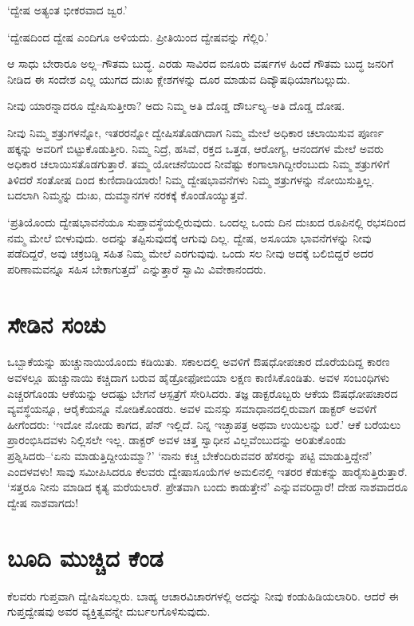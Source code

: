 ‘ದ್ವೇಷ ಅತ್ಯಂತ ಭೀಕರವಾದ ಜ್ವರ.’

‘ದ್ವೇಷದಿಂದ ದ್ವೇಷ ಎಂದಿಗೂ ಅಳಿಯದು. ಪ್ರೀತಿಯಿಂದ ದ್ವೇಷವನ್ನು ಗೆಲ್ಲಿರಿ.’

ಆ ಸಾಧು ಬೇರಾರೂ ಅಲ್ಲ–ಗೌತಮ ಬುದ್ಧ. ಎರಡು ಸಾವಿರದ ಐನೂರು ವರ್ಷಗಳ ಹಿಂದೆ ಗೌತಮ ಬುದ್ಧ ಜನರಿಗೆ ನೀಡಿದ ಈ ಸಂದೇಶ ಎಲ್ಲ ಯುಗದ ದುಃಖ ಕ್ಲೇಶಗಳನ್ನು ದೂರ ಮಾಡುವ ದಿವ್ಯೌಷಧಿಯಾಗಬಲ್ಲುದು.

ನೀವು ಯಾರನ್ನಾದರೂ ದ್ವೇಷಿಸುತ್ತೀರಾ? ಅದು ನಿಮ್ಮ ಅತಿ ದೊಡ್ಡ ದೌರ್ಬಲ್ಯ–ಅತಿ ದೊಡ್ಡ ದೋಷ.

ನೀವು ನಿಮ್ಮ ಶತ್ರುಗಳನ್ನೋ, ಇತರರನ್ನೋ ದ್ವೇಷಿಸತೊಡಗಿದಾಗ ನಿಮ್ಮ ಮೇಲೆ ಅಧಿಕಾರ ಚಲಾಯಿಸುವ ಪೂರ್ಣ ಹಕ್ಕನ್ನು ಅವರಿಗೆ ಬಿಟ್ಟುಕೊಡುತ್ತೀರಿ. ನಿಮ್ಮ ನಿದ್ರೆ, ಹಸಿವೆ, ರಕ್ತದ ಒತ್ತಡ, ಆರೋಗ್ಯ, ಆನಂದಗಳ ಮೇಲೆ ಅವರು ಅಧಿಕಾರ ಚಲಾಯಿಸತೊಡಗುತ್ತಾರೆ. ತಮ್ಮ ಯೋಚನೆಯಿಂದ ನೀವೆಷ್ಟು ಕಂಗಾಲಾಗಿದ್ದೀರೆಂಬುದು ನಿಮ್ಮ ಶತ್ರುಗಳಿಗೆ ತಿಳಿದರೆ ಸಂತೋಷ ದಿಂದ ಕುಣಿದಾಡಿಯಾರು! ನಿಮ್ಮ ದ್ವೇಷಭಾವನೆಗಳು ನಿಮ್ಮ ಶತ್ರುಗಳನ್ನು ನೋಯಿಸುತ್ತಿಲ್ಲ. ಬದಲಾಗಿ ನಿಮ್ಮನ್ನು ದುಃಖ, ದುಮ್ಮಾನಗಳ ನರಕಕ್ಕೆ ಕೊಂಡೊಯ್ಯುತ್ತವೆ.

‘ಪ್ರತಿಯೊಂದು ದ್ವೇಷಭಾವನೆಯೂ ಸುಪ್ತಾವಸ್ಥೆಯಲ್ಲಿರುವುದು. ಒಂದಲ್ಲ ಒಂದು ದಿನ ದುಃಖದ ರೂಪಿನಲ್ಲಿ ರಭಸದಿಂದ ನಮ್ಮ ಮೇಲೆ ಬೀಳುವುದು. ಅದನ್ನು ತಪ್ಪಿಸುವುದಕ್ಕೆ ಆಗುವು ದಿಲ್ಲ. ದ್ವೇಷ, ಅಸೂಯಾ ಭಾವನೆಗಳನ್ನು ನೀವು ಪಡೆದಿದ್ದರೆ, ಅವು ಚಕ್ರಬಡ್ಡಿ ಸಹಿತ ನಿಮ್ಮ ಮೇಲೆ ಎರಗುವುವು. ಒಂದು ಸಲ ನೀವು ಅದಕ್ಕೆ ಬಲಿಬಿದ್ದರೆ ಅದರ ಪರಿಣಾಮವನ್ನೂ ಸಹಿಸ ಬೇಕಾಗುತ್ತದೆ’ ಎನ್ನುತ್ತಾರೆ ಸ್ವಾಮಿ ವಿವೇಕಾನಂದರು.


\section{ಸೇಡಿನ ಸಂಚು}

ಒಬ್ಬಾಕೆಯನ್ನು ಹುಚ್ಚುನಾಯಿಯೊಂದು ಕಡಿಯಿತು. ಸಕಾಲದಲ್ಲಿ ಅವಳಿಗೆ ಔಷಧೋಪಚಾರ ದೊರೆಯದಿದ್ದ ಕಾರಣ ಅವಳಲ್ಲೂ ಹುಚ್ಚುನಾಯಿ ಕಚ್ಚಿದಾಗ ಬರುವ ಹೈಡ್ರೋಫೋಬಿಯಾ ಲಕ್ಷಣ ಕಾಣಿಸಿಕೊಂಡಿತು. ಅವಳ ಸಂಬಂಧಿಗಳು ಎಚ್ಚರಗೊಂಡು ಆಕೆಯನ್ನು ಆದಷ್ಟು ಬೇಗನೆ ಆಸ್ಪತ್ರೆಗೆ ಸೇರಿಸಿದರು. ತಜ್ಞ ಡಾಕ್ಟರೊಬ್ಬರು ಆಕೆಯ ಔಷಧೋಪಚಾರದ ವ್ಯವಸ್ಥೆಯನ್ನೂ, ಆರೈಕೆಯನ್ನೂ ನೋಡಿಕೊಂಡರು. ಅವಳ ಮನಸ್ಸು ಸಮಾಧಾನದಲ್ಲಿರುವಾಗ ಡಾಕ್ಟರ್ ಅವಳಿಗೆ ಹೀಗೆಂದರು: ‘ಇದೋ ನೋಡು ಕಾಗದ, ಪೆನ್ ಇಲ್ಲಿದೆ. ನಿನ್ನ ಇಚ್ಛಾಪತ್ರ ಅಥವಾ ಉಯಿಲನ್ನು ಬರೆ.’ ಆಕೆ ಬರೆಯಲು ಪ್ರಾರಂಭಿಸಿದವಳು ನಿಲ್ಲಿಸಲೇ ಇಲ್ಲ. ಡಾಕ್ಟರ್ ಅವಳ ಚಿತ್ತ ಸ್ವಾಧೀನ ವಿಲ್ಲವೆಂಬುದನ್ನು ಅರಿತುಕೊಂಡು ಪ್ರಶ್ನಿಸಿದರು–‘ಏನು ಮಾಡುತ್ತಿದ್ದೀಯಮ್ಮಾ?’ ‘ನಾನು ಕಚ್ಚ ಬೇಕೆಂದಿರುವವರ ಹೆಸರನ್ನು ಪಟ್ಟಿ ಮಾಡುತ್ತಿದ್ದೇನೆ’ ಎಂದಳವಳು! ಸಾವು ಸಮೀಪಿಸಿದರೂ ಕೆಲವರು ದ್ವೇಷಾಸೂಯೆಗಳ ಅಮಲಿನಲ್ಲಿ ಇತರರ ಕೆಡುಕನ್ನು ಹಾರೈಸುತ್ತಿರುತ್ತಾರೆ. ‘ಸತ್ತರೂ ನೀನು ಮಾಡಿದ ಕೃತ್ಯ ಮರೆಯಲಾರೆ. ಪ್ರೇತವಾಗಿ ಬಂದು ಕಾಡುತ್ತೇನೆ’ ಎನ್ನುವವರಿದ್ದಾರೆ! ದೇಹ ನಾಶವಾದರೂ ದ್ವೇಷ ನಾಶವಾಗದು!


\section{ಬೂದಿ ಮುಚ್ಚಿದ ಕೆಂಡ}

ಕೆಲವರು ಗುಪ್ತವಾಗಿ ದ್ವೇಷಿಸಬಲ್ಲರು. ಬಾಹ್ಯ ಆಚಾರವಿಚಾರಗಳಲ್ಲಿ ಅದನ್ನು ನೀವು ಕಂಡುಹಿಡಿಯಲಾರಿರಿ. ಆದರೆ ಈ ಗುಪ್ತದ್ವೇಷವು ಅವರ ವ್ಯಕ್ತಿತ್ವವನ್ನೇ ದುರ್ಬಲಗೊಳಿಸುವುದು.

